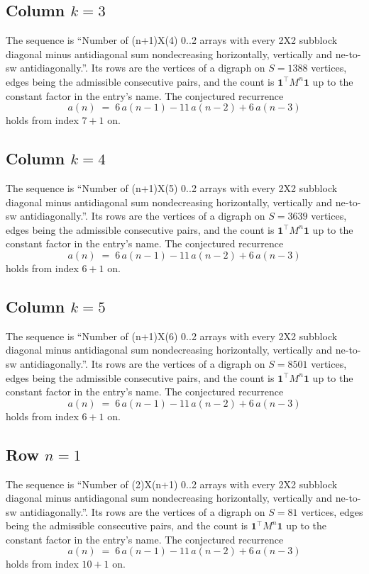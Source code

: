 \documentclass[11pt,a4paper]{article}
\theoremstyle{plain}
\theoremstyle{definition}
\begin{document}
\subsection*{Column $k$$=3$}
The sequence is ``Number of (n+1)X(4) 0..2 arrays with every 2X2 subblock diagonal minus antidiagonal sum nondecreasing horizontally, vertically and ne-to-sw antidiagonally.''. Its rows are the vertices of a digraph on
$S=1388$ vertices, edges being the admissible consecutive pairs, and the count is
$\mathbf{1}^{\!\top}M^{n}\mathbf{1}$ up to the constant factor in the entry's name.
The conjectured recurrence
\[
a(n)\;=\;6\,a(n-1) - 11\,a(n-2) + 6\,a(n-3)
\]
holds from index $7+1$ on.

\subsection*{Column $k$$=4$}
The sequence is ``Number of (n+1)X(5) 0..2 arrays with every 2X2 subblock diagonal minus antidiagonal sum nondecreasing horizontally, vertically and ne-to-sw antidiagonally.''. Its rows are the vertices of a digraph on
$S=3639$ vertices, edges being the admissible consecutive pairs, and the count is
$\mathbf{1}^{\!\top}M^{n}\mathbf{1}$ up to the constant factor in the entry's name.
The conjectured recurrence
\[
a(n)\;=\;6\,a(n-1) - 11\,a(n-2) + 6\,a(n-3)
\]
holds from index $6+1$ on.

\subsection*{Column $k$$=5$}
The sequence is ``Number of (n+1)X(6) 0..2 arrays with every 2X2 subblock diagonal minus antidiagonal sum nondecreasing horizontally, vertically and ne-to-sw antidiagonally.''. Its rows are the vertices of a digraph on
$S=8501$ vertices, edges being the admissible consecutive pairs, and the count is
$\mathbf{1}^{\!\top}M^{n}\mathbf{1}$ up to the constant factor in the entry's name.
The conjectured recurrence
\[
a(n)\;=\;6\,a(n-1) - 11\,a(n-2) + 6\,a(n-3)
\]
holds from index $6+1$ on.

\subsection*{Row $n$$=1$}
The sequence is ``Number of (2)X(n+1) 0..2 arrays with every 2X2 subblock diagonal minus antidiagonal sum nondecreasing horizontally, vertically and ne-to-sw antidiagonally.''. Its rows are the vertices of a digraph on
$S=81$ vertices, edges being the admissible consecutive pairs, and the count is
$\mathbf{1}^{\!\top}M^{n}\mathbf{1}$ up to the constant factor in the entry's name.
The conjectured recurrence
\[
a(n)\;=\;6\,a(n-1) - 11\,a(n-2) + 6\,a(n-3)
\]
holds from index $10+1$ on.
\end{document}
